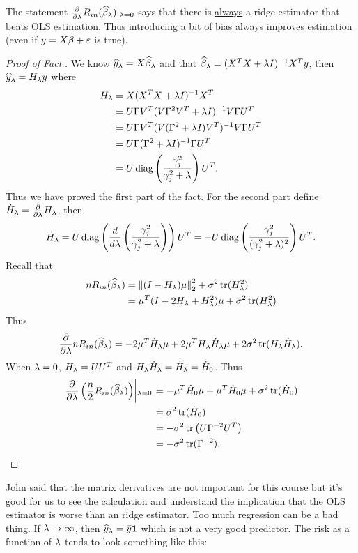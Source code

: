 The statement $\frac{\partial}{\partial \lambda} R_{in}(\widehat{\beta}_\lambda)|_{\lambda = 0}$ says that there is \underline{always} a ridge estimator that beats OLS estimation. Thus introducing a bit of bias \underline{always} improves estimation (even if $y=X\beta+\varepsilon$ is true).
\begin{proof}[Proof of Fact.]
    We know $\widehat{y}_\lambda = X\widehat{\beta}_\lambda$ and that $\widehat{\beta}_\lambda = (X^TX+\lambda I)^{-1}X^Ty$, then $\widehat{y}_\lambda = H_\lambda y$ where 
    \begin{align*}
        H_\lambda &= X(X^TX+\lambda I)^{-1}X^T\\
        &= U\Gamma V^T(V\Gamma^2 V^T+\lambda I)^{-1}V\Gamma U^T\\
        &= U\Gamma V^T(V(\Gamma^2+\lambda I)V^T)^{-1}V\Gamma U^T\\
        &= U\Gamma (\Gamma^2+\lambda I)^{-1}\Gamma U^T\\
        &= U\operatorname*{diag}\left(\frac{\gamma_j^2}{\gamma_j^2+\lambda}\right)U^T.
    \end{align*}
    Thus we have proved the first part of the fact. For the second part define $\dot{H}_\lambda = \frac{\partial}{\partial \lambda} H_\lambda$, then 
    \[\dot{H}_\lambda = U\operatorname*{diag}\left(\frac{d}{d\lambda}\left(\frac{\gamma_j^2}{\gamma_j^2+\lambda}\right)\right)U^T =-U\operatorname*{diag}\left(\frac{\gamma_j^2}{(\gamma_j^2+\lambda)^2}\right)U^T. \]
    Recall that
    \begin{align*}
        nR_{in}(\widehat{\beta}_\lambda) &= \left\|(I-H_\lambda)\mu\right\|_2^2+\sigma^2\operatorname*{tr}(H^2_\lambda)\\
        &=\mu^T(I-2H_\lambda +H_\lambda^2)\mu +\sigma^2 \operatorname*{tr}(H_\lambda^2)
    \end{align*}
    Thus 
    \[\frac{\partial}{\partial \lambda} n R_{in}(\widehat{\beta}_\lambda) = -2\mu^T\dot{H}_\lambda \mu + 2\mu^T H_\lambda\dot{H}_\lambda\mu + 2\sigma^2\operatorname*{tr}(H_\lambda \dot{H}_\lambda). \]
    When $\lambda = 0$, $H_\lambda = UU^T$ and $H_\lambda \dot{H}_\lambda = \dot{H}_\lambda=\dot{H}_0$. Thus 
    \begin{align*}
        \left.\frac{\partial}{\partial \lambda}\left(\frac{n}{2}R_{in}(\widehat{\beta}_\lambda)\right)\middle|_{\lambda = 0}\right.&= -\mu^T \dot{H}_0 \mu +\mu^T \dot{H}_0 \mu + \sigma^2 \operatorname*{tr}(\dot{H}_0)\\
        &= \sigma^2 \operatorname*{tr}(\dot{H}_0)\\
        &=-\sigma^2 \operatorname*{tr}\left(U \Gamma^{-2}U^T\right)\\
        &=-\sigma^2 \operatorname*{tr}(\Gamma^{-2}). \qedhere 
    \end{align*}
\end{proof}
John said that the matrix  derivatives are not important for this course but it's good for us to see the calculation and understand the implication that the OLS estimator is worse than an ridge estimator. Too much regression can be a bad thing. If $\lambda \to \infty$, then $\widehat{y}_\lambda = \bar{y}{{\bf 1}}$ which is not a very good predictor. The risk as a function of $\lambda$ tends to look something like this:

